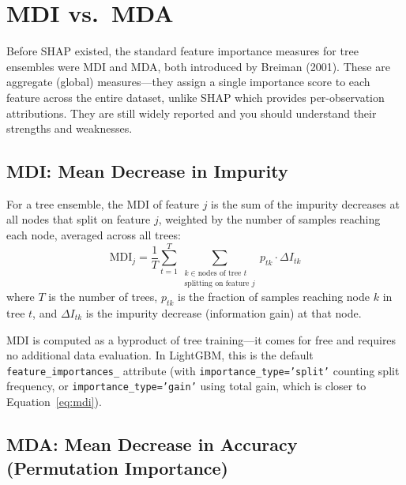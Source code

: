 \section{MDI vs.\ MDA}
\label{sec:mdi-mda}

\begin{prereq}
Before SHAP existed, the standard feature importance measures for tree ensembles were MDI and MDA, both introduced by Breiman (2001).
These are aggregate (global) measures---they assign a single importance score to each feature across the entire dataset, unlike SHAP which provides per-observation attributions.
They are still widely reported and you should understand their strengths and weaknesses.
\end{prereq}

\subsection{MDI: Mean Decrease in Impurity}

\begin{definition}
For a tree ensemble, the MDI of feature $j$ is the sum of the impurity decreases at all nodes that split on feature $j$, weighted by the number of samples reaching each node, averaged across all trees:
\begin{equation}
\mathrm{MDI}_j = \frac{1}{T} \sum_{t=1}^T \sum_{\substack{k \in \text{nodes of tree } t \\ \text{splitting on feature } j}} p_{tk} \cdot \Delta I_{tk}
\label{eq:mdi}
\end{equation}
where $T$ is the number of trees, $p_{tk}$ is the fraction of samples reaching node $k$ in tree $t$, and $\Delta I_{tk}$ is the impurity decrease (information gain) at that node.
\end{definition}

MDI is computed as a byproduct of tree training---it comes for free and requires no additional data evaluation.
In LightGBM, this is the default \texttt{feature\_importances\_} attribute (with \texttt{importance\_type='split'} counting split frequency, or \texttt{importance\_type='gain'} using total gain, which is closer to Equation~\eqref{eq:mdi}).

\subsection{MDA: Mean Decrease in Accuracy (Permutation Importance)}

